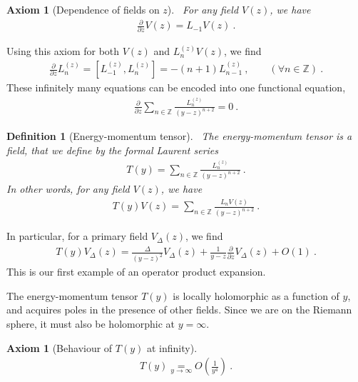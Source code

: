 \documentclass[12pt, a4paper]{article}
\theoremstyle{break}
\newtheorem{hyp}[exo]{Axiom}
\newtheorem{defn}[exo]{Definition}
\begin{document}
\begin{hyp}[Dependence of fields on $z$]
 ~\label{hyp:geom}
 For any field $V(z)$, we have 
 \begin{align}
  \frac{\partial}{\partial z} V(z) = L_{-1} V(z)  \ .
  \label{pvlv}
 \end{align}
\end{hyp}

Using this axiom for both $V(z)$ and $L_n^{(z)}V(z)$, we find 
\begin{align}
 \frac{\partial}{\partial z} L_n^{(z)} = [L_{-1}^{(z)},L_n^{(z)}]= -(n+1)L_{n-1}^{(z)}\ ,\qquad (\forall n\in\mathbb{Z})\ .
\end{align}
These infinitely many equations can be encoded into one functional equation,
\begin{align}
 \frac{\partial}{\partial z} \sum_{n\in\mathbb{Z}} \frac{L_n^{(z)}}{(y-z)^{n+2}} = 0\ .
\end{align}

\begin{defn}[Energy-momentum tensor]
 ~\label{def:em}
 The energy-momentum tensor is a field, that we define by the formal Laurent series
 \begin{align}
  T(y) = \sum_{n\in\mathbb{Z}} \frac{L_n^{(z)}}{(y-z)^{n+2}} \ .
 \end{align}
In other words, for any field $V(z)$, we have 
\begin{align}
 T(y)V(z) = \sum_{n\in\mathbb{Z}} \frac{L_n V(z)}{(y-z)^{n+2}}\ .
 \label{eq:lvtv}
\end{align}
\end{defn}
In particular, for a primary field $V_\Delta(z)$, we find 
\begin{align}
 T(y)V_\Delta(z) = \frac{\Delta}{(y-z)^2} V_\Delta(z) + \frac{1}{y-z} \frac{\partial}{\partial z} V_\Delta(z) + O(1)\ . 
 \label{eq:tvd}
\end{align}
This is our first example of an operator product expansion.

The energy-momentum tensor $T(y)$ is locally holomorphic as a function of $y$, and acquires poles in the presence of other fields. Since we are on the Riemann sphere, it must also be holomorphic at $y=\infty$. 

\begin{hyp}[Behaviour of $T(y)$ at infinity]
~\label{hyp:ti}
 \begin{align}
 T(y) \underset{y\to\infty} = O\left(\frac{1}{y^4}\right)\ .
 \label{eq:tinf}
\end{align}
\end{hyp}
\end{document}
